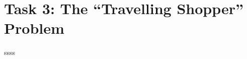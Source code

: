 \documentclass[hyperref]{article}
\theoremstyle{nonumberplain}
\begin{document}
\section{Task 3: The “Travelling Shopper” Problem}
\hspace{1.0em}

ssss



\newpage

%	
%	





	
\end{document}
